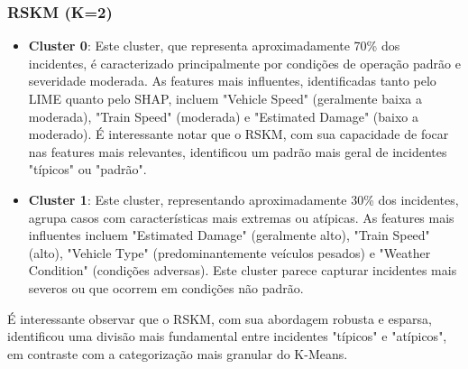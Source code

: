 \documentclass[conference]{IEEEtran}
\begin{document}
\subsubsection{RSKM (K=2)}
\begin{itemize}
    \item \textbf{Cluster 0}: Este cluster, que representa aproximadamente 70\% dos incidentes, é caracterizado principalmente por condições de operação padrão e severidade moderada. As features mais influentes, identificadas tanto pelo LIME quanto pelo SHAP, incluem "Vehicle Speed" (geralmente baixa a moderada), "Train Speed" (moderada) e "Estimated Damage" (baixo a moderado). É interessante notar que o RSKM, com sua capacidade de focar nas features mais relevantes, identificou um padrão mais geral de incidentes "típicos" ou "padrão".
    
    \item \textbf{Cluster 1}: Este cluster, representando aproximadamente 30\% dos incidentes, agrupa casos com características mais extremas ou atípicas. As features mais influentes incluem "Estimated Damage" (geralmente alto), "Train Speed" (alto), "Vehicle Type" (predominantemente veículos pesados) e "Weather Condition" (condições adversas). Este cluster parece capturar incidentes mais severos ou que ocorrem em condições não padrão.
\end{itemize}

É interessante observar que o RSKM, com sua abordagem robusta e esparsa, identificou uma divisão mais fundamental entre incidentes "típicos" e "atípicos", em contraste com a categorização mais granular do K-Means.
\end{document}
